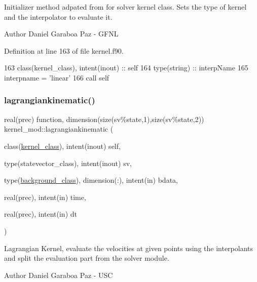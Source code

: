 Initializer method adpated from for solver kernel class. Sets the type of kernel and the interpolator to evaluate it. 

\begin{DoxyAuthor}{Author}
Daniel Garaboa Paz -\/ G\+F\+NL 
\end{DoxyAuthor}


Definition at line 163 of file kernel.\+f90.


\begin{DoxyCode}
163     \textcolor{keywordtype}{class}(kernel\_class), \textcolor{keywordtype}{intent(inout)} :: self
164     \textcolor{keywordtype}{type}(string) :: interpName
165     interpname = \textcolor{stringliteral}{'linear'}
166     \textcolor{keyword}{call }self%
\end{DoxyCode}
\mbox{\label{namespacekernel__mod_aec47ab247a9afc2a7fdc272620b3c5e8}} 
\subsubsection{\texorpdfstring{lagrangiankinematic()}{lagrangiankinematic()}}
{\footnotesize\ttfamily real(prec) function, dimension(size(sv\%state,1),size(sv\%state,2)) kernel\+\_\+mod\+::lagrangiankinematic (\begin{DoxyParamCaption}\item[{class(\mbox{\hyperlink{structkernel__mod_1_1kernel__class}{kernel\+\_\+class}}), intent(inout)}]{self,  }\item[{type(statevector\+\_\+class), intent(inout)}]{sv,  }\item[{type(\mbox{\hyperlink{structbackground__mod_1_1background__class}{background\+\_\+class}}), dimension(\+:), intent(in)}]{bdata,  }\item[{real(prec), intent(in)}]{time,  }\item[{real(prec), intent(in)}]{dt }\end{DoxyParamCaption})}



Lagrangian Kernel, evaluate the velocities at given points using the interpolants and split the evaluation part from the solver module. 

\begin{DoxyAuthor}{Author}
Daniel Garaboa Paz -\/ U\+SC 
\end{DoxyAuthor}

